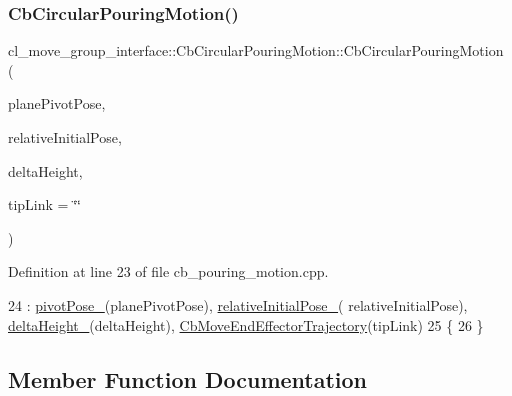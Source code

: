 \subsubsection{\texorpdfstring{Cb\+Circular\+Pouring\+Motion()}{CbCircularPouringMotion()}\hspace{0.1cm}{\footnotesize\ttfamily [3/3]}}
{\footnotesize\ttfamily cl\+\_\+move\+\_\+group\+\_\+interface\+::\+Cb\+Circular\+Pouring\+Motion\+::\+Cb\+Circular\+Pouring\+Motion (\begin{DoxyParamCaption}\item[{const geometry\+\_\+msgs\+::\+Pose\+Stamped \&}]{plane\+Pivot\+Pose,  }\item[{const geometry\+\_\+msgs\+::\+Pose \&}]{relative\+Initial\+Pose,  }\item[{double}]{delta\+Height,  }\item[{std\+::string}]{tip\+Link = {\ttfamily \char`\"{}\char`\"{}} }\end{DoxyParamCaption})}



Definition at line 23 of file cb\+\_\+pouring\+\_\+motion.\+cpp.


\begin{DoxyCode}
24         : \hyperlink{classcl__move__group__interface_1_1CbCircularPouringMotion_a58ce9c29e4ef8f09a7569d6d8f9df56b}{pivotPose\_}(planePivotPose), \hyperlink{classcl__move__group__interface_1_1CbCircularPouringMotion_ab6323315364e1f8bc60cbad3daa72fa9}{relativeInitialPose\_}(
      relativeInitialPose), \hyperlink{classcl__move__group__interface_1_1CbCircularPouringMotion_a7009d617bcd8ac1fba49100444434f3c}{deltaHeight\_}(deltaHeight), \hyperlink{classcl__move__group__interface_1_1CbMoveEndEffectorTrajectory_af7e718b0c53e912fd74968abbb0a4810}{CbMoveEndEffectorTrajectory}(tipLink)
25     \{
26     \}
\end{DoxyCode}


\subsection{Member Function Documentation}
\mbox{\label{classcl__move__group__interface_1_1CbCircularPouringMotion_a4986b396e0ba318a0046feea3f6eede6}} 
